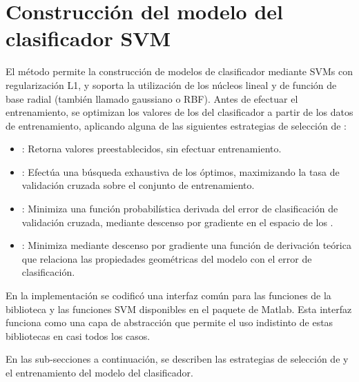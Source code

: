 %
%
\section{Construcción del modelo del clasificador SVM}
%
El método permite la construcción de modelos de clasificador mediante
SVMs con regularización L1, y soporta la utilización de los núcleos
lineal y de función de base radial (también llamado gaussiano o RBF).
Antes de efectuar el entrenamiento, se optimizan los valores de los
 del clasificador a partir de los datos de entrenamiento,
aplicando alguna de las siguientes estrategias de selección de
:
%
\begin{itemize}
\item
  : Retorna valores preestablecidos,
  sin efectuar entrenamiento.
\item
  : Efectúa una búsqueda exhaustiva de los
   óptimos, maximizando la tasa \GM{} de validación cruzada
  sobre el conjunto de entrenamiento.
\item
  : Minimiza una función probabilística
  derivada del error de clasificación de validación cruzada, mediante
  descenso por gradiente en el espacio de los .
\item
  : Minimiza mediante descenso
  por gradiente una función de derivación teórica que relaciona
  las propiedades geométricas del modelo con el error de clasificación.
\end{itemize}
%

En la implementación se codificó una interfaz común para las funciones
de la biblioteca  \cite{libsvm} y las funciones SVM
disponibles en el paquete  de Matlab.
Esta interfaz funciona como una capa de abstracción que permite el uso
indistinto de estas bibliotecas en casi todos los casos.

En las sub-secciones a continuación, se describen las estrategias de
selección de  y el entrenamiento del modelo del
clasificador.
